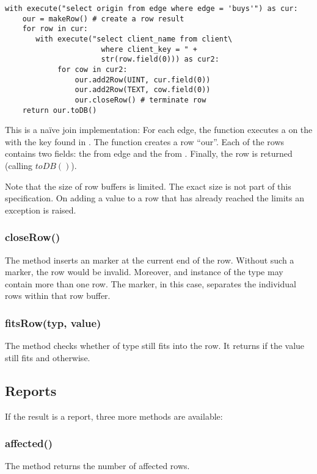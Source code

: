 \begin{python}
\begin{lstlisting}
with execute("select origin from edge where edge = 'buys'") as cur:
    our = makeRow() # create a row result
    for row in cur:
       with execute("select client_name from client\
                      where client_key = " +
                      str(row.field(0))) as cur2:
            for cow in cur2:
                our.add2Row(UINT, cur.field(0))
                our.add2Row(TEXT, cow.field(0))
                our.closeRow() # terminate row
    return our.toDB() 
\end{lstlisting}
\end{python}

This is a na\"ive join implementation:
For each edge, the function executes a 
on the  with the key found in .
The function creates a row ``our''.
Each of the rows contains two fields: the 
from edge and the  from .
Finally, the row is returned (calling $toDB()$).

Note that the size of row buffers is limited.
The exact size is not part of this specification.
On adding a value to a row that has already reached
the limits an exception is raised.

\subsubsection{closeRow()}
The method inserts an  marker
at the current end of the row.
Without such a marker, the row would be invalid.
Moreover, and instance of the  type
may contain more than one row.
The marker, in this case, separates the individual
rows within that row buffer.

\subsubsection{fitsRow(typ, value)}
The method checks whether  of type 
still fits into the row. It returns 
if the value still fits and  otherwise.

\subsection{Reports}
If the result is a report,
three more methods are available:

\subsubsection{affected()}
The method returns the number of affected rows.

